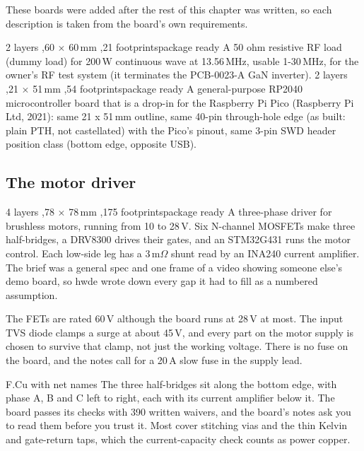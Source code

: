 These boards were added after the rest of this chapter was written, so each
description is taken from the board's own requirements.

\boardpair
{%
{2 layers \sep 60 $\times$ 60\,mm \sep 21 footprints}{package ready}%
{A 50 ohm resistive RF load (dummy load) for 200\,W continuous wave at
13.56\,MHz, usable 1-30\,MHz, for the owner's RF test system (it terminates
the PCB-0023-A GaN inverter).}}
{%
{2 layers \sep 21 $\times$ 51\,mm \sep 54 footprints}{package ready}%
{A general-purpose RP2040 microcontroller board that is a drop-in for the
Raspberry Pi Pico (Raspberry Pi Ltd, 2021): same 21 x 51\,mm outline, same
40-pin through-hole edge (as built: plain PTH, not castellated) with the
Pico's pinout, same 3-pin SWD header position class (bottom edge, opposite
USB).}}

\newpage

\subsection{The motor driver}
\label{pg:bldc}

%
{4 layers \sep 78 $\times$ 78\,mm \sep 175 footprints}{package ready}%
{A three-phase driver for brushless motors, running from 10 to 28\,V. Six
N-channel MOSFETs make three half-bridges, a DRV8300 drives their gates, and
an STM32G431 runs the motor control. Each low-side leg has a 3\,m$\Omega$
shunt read by an INA240 current amplifier. The brief was a general spec and
one frame of a video showing someone else's demo board, so hwde wrote down
every gap it had to fill as a numbered assumption.}

The FETs are rated 60\,V although the board runs at 28\,V at most. The input
TVS diode clamps a surge at about 45\,V, and every part on the motor supply is
chosen to survive that clamp, not just the working voltage. There is no fuse
on the board, and the notes call for a 20\,A slow fuse in the supply lead.

\newpage

%
{F.Cu with net names}{}%
{The three half-bridges sit along the bottom edge, with phase A, B and C left
to right, each with its current amplifier below it. The board passes its
checks with 390 written waivers, and the board's notes ask you to read them
before you trust it. Most cover stitching vias and the thin Kelvin and
gate-return taps, which the current-capacity check counts as power copper.}

